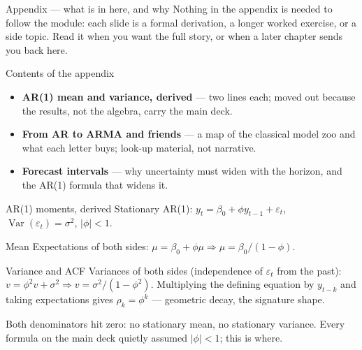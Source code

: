 \documentclass[aspectratio=169,11pt]{beamer}
\begin{document}
\begin{frame}{Appendix --- what is in here, and why}
  \footnotesize
  Nothing in the appendix is needed to follow the module: each slide is a formal
  derivation, a longer worked exercise, or a side topic. Read it when you want the
  full story, or when a later chapter sends you back here.
  \begin{block}{Contents of the appendix}
    \begin{itemize}
      \item \textbf{AR(1) mean and variance, derived} --- two lines each; moved out
            because the results, not the algebra, carry the main deck.
      \item \textbf{From AR to ARMA and friends} --- a map of the classical model
            zoo and what each letter buys; look-up material, not narrative.
      \item \textbf{Forecast intervals} --- why uncertainty must widen with the
            horizon, and the AR(1) formula that widens it.
    \end{itemize}
  \end{block}
\end{frame}

\begin{frame}{AR(1) moments, derived}
  \footnotesize
  Stationary AR(1): $y_t = \beta_0 + \phi y_{t-1} + \varepsilon_t$,
  $\operatorname{Var}(\varepsilon_t) = \sigma^2$, $|\phi| < 1$.
  \begin{block}{Mean}
    Expectations of both sides: $\mu = \beta_0 + \phi\mu \Rightarrow
    \mu = \beta_0/(1-\phi)$.
  \end{block}
  \begin{block}{Variance and ACF}
    Variances of both sides (independence of $\varepsilon_t$ from the past):
    $v = \phi^2 v + \sigma^2 \Rightarrow v = \sigma^2/(1-\phi^2)$. Multiplying the
    defining equation by $y_{t-k}$ and taking expectations gives
    $\rho_k = \phi^k$ --- geometric decay, the signature shape.
  \end{block}
  \begin{takeaway}[{{Why $\phi = 1$ destroys everything}}]
    Both denominators hit zero: no stationary mean, no stationary variance. Every
    formula on the main deck quietly assumed $|\phi| < 1$; this is where.
  \end{takeaway}
\end{frame}
\end{document}
